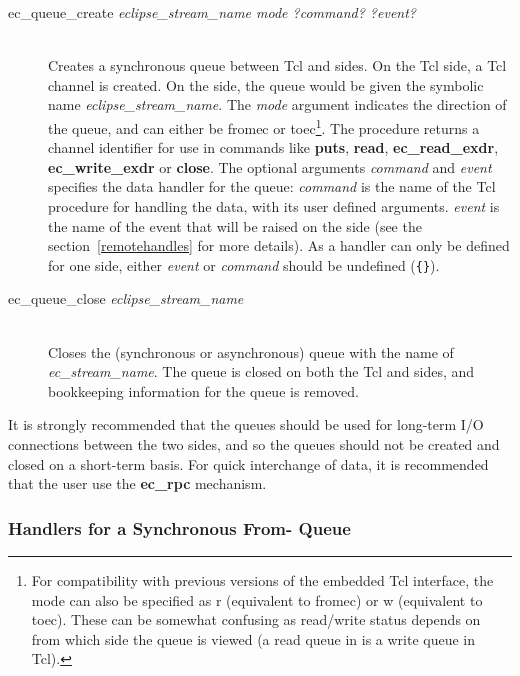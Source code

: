 \begin{description}
\item[ec_queue_create {\it
eclipse_stream_name mode ?command? ?event?}]\ \\
        Creates a synchronous queue between Tcl and {\eclipse} sides. On
        the Tcl side, a Tcl channel is created. On the {\eclipse} side, the 
        queue would be given the symbolic name {\it eclipse_stream_name}. 
        The {\it mode} argument indicates the direction of the queue, and
        can either be fromec or toec\footnote{For compatibility with previous
        versions of the embedded Tcl interface, the mode can also be
        specified as r (equivalent to fromec) or w (equivalent to
        toec). These can be somewhat confusing as read/write status depends
        on from which side the queue is viewed (a read queue in {\eclipse} is a
        write queue in Tcl).}.
        The procedure returns a channel identifier for use in commands
        like {\bf puts}, {\bf read}, {\bf ec_read_exdr},
        {\bf ec_write_exdr} or {\bf close}. The optional arguments {\it
        command\/} and {\it event\/} specifies the data handler for the
        queue: {\it command\/} is the name
        of the Tcl
        procedure for handling the data, with its user defined arguments. 
        {\it event} is the name of the event that will be
        raised on the {\eclipse} side (see the section~\ref{remotehandles}
        for more details). As a handler can only be defined for one side,
        either {\it event\/} or {\it command\/} should be undefined
        (\verb'{}'). 
\item[ec_queue_close {\it
eclipse_stream_name}]\ \\
	Closes the (synchronous or asynchronous) queue with the {\eclipse} name of {\it
	ec_stream_name}. The queue is closed on both the Tcl and {\eclipse}
	sides, and bookkeeping information for the queue is removed. 

\end{description}

It is strongly recommended that the queues should be used for long-term I/O
connections between the two sides, and so the queues should not be created
and closed on a short-term basis. For quick interchange of data, it is
recommended that the user use the {\bf ec_rpc} mechanism.

\subsubsection{Handlers for a Synchronous From-{\eclipse} Queue}

